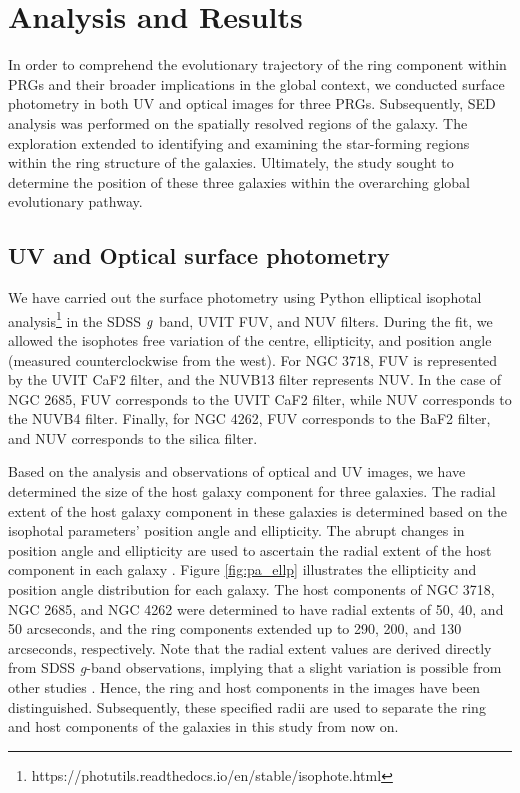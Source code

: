 \documentclass{pas}
\begin{document}
\section{Analysis and Results}
\label{sec:anal_res}
In order to comprehend the evolutionary trajectory of the ring component within PRGs and their broader implications in the global context, we conducted surface photometry in both UV and optical images for three PRGs. Subsequently, SED analysis was performed on {the spatially resolved regions} of the galaxy. The exploration extended to identifying and examining the star-forming regions within the ring structure of the galaxies. Ultimately, the study sought to determine the position of these three galaxies within the overarching global evolutionary pathway.

\subsection{UV and Optical surface photometry}
\label{sec:UV_opt_phot}
We have carried out the surface photometry using Python elliptical isophotal analysis\footnote{https://photutils.readthedocs.io/en/stable/isophote.html} \citep{jedrzejwski1987} in the SDSS $\it g$ band, UVIT FUV, and NUV filters. During the fit, we allowed the isophotes free variation of the centre, ellipticity, and position angle (measured counterclockwise from the west). For NGC 3718, FUV is represented by the UVIT CaF2 filter, and the NUVB13 filter represents NUV. In the case of NGC 2685, FUV corresponds to the UVIT CaF2 filter, while NUV corresponds to the NUVB4 filter. Finally, for NGC 4262, FUV corresponds to the BaF2 filter, and NUV corresponds to the silica filter.\par

Based on the analysis and observations of optical and UV images, we have determined the size of the host galaxy component for three galaxies. The radial extent of the host galaxy component in these galaxies is determined based on the isophotal parameters' position angle and ellipticity. The abrupt changes in position angle and ellipticity are used to ascertain the radial extent of the host component in each galaxy \citep{2005Erwin_isophote,2011Li_isophote,2024akr}. Figure \ref{fig:pa_ellp} illustrates the ellipticity and position angle distribution for each galaxy. The host components of NGC 3718, NGC 2685, and NGC 4262 were determined to have radial extents of 50, 40, and {50} arcseconds, and the ring components extended up to 290, 200, and 130 arcseconds, respectively. Note that the radial extent values are derived directly from SDSS {\it g}-band observations, implying that a slight variation is possible from other studies \citep[e.g.][]{2009Sparke,2002Schinnerer,2024akr_2}. Hence, the ring and host components in the images have been distinguished. Subsequently, these specified radii are used to separate the ring and host components of the galaxies in this study from now on.
    
\end{document}
